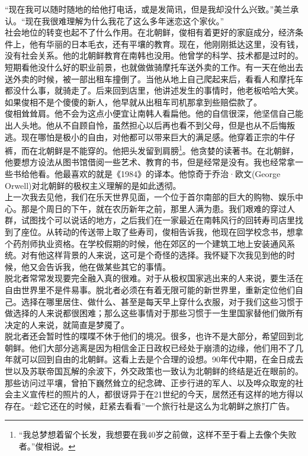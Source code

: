 “现在我可以随时随地的给他打电话，或是发简讯，但是我却没什么兴致。”美兰承认。“现在我很难理解为什么我花了这么多年迷恋这个家伙。”\\

社会地位的转变也起不了什么作用。在北朝鲜，俊相有着更好的家庭成分，经济条件上，他有华丽的日本毛衣，还有平壤的教育。现在，他刚刚抵达这里，没有钱，没有社会关系。他的北朝鲜教育在南韩也没用。他曾学的科学、技术都是过时的。短期看他没什么好的职业前景，也就做做骑摩托车送外卖的工作。有一天在他出去送外卖的时候，被一部出租车撞倒了。当他从地上自己爬起来后，看看人和摩托车都没什么事，就骑走了。后来回到店里，他讲述发生的事情时，他老板哈哈大笑。如果俊相不是个傻傻的新人，他早就从出租车司机那拿到些赔偿款了。\\

俊相耸耸肩。他不会为这点小便宜让南韩人看扁他。他的自信很深，他坚信自己能出人头地。他从不自顾自怜，虽然担心以后再也看不到父母，但是也从不后悔叛逃。现在哪怕是极小的自由，对他都可以带来巨大的满足感。他穿着正宗的牛仔裤，而在北朝鲜是不能穿的。他把头发留到肩膀\footnote{“我总梦想着留个长发，我想要在我40岁之前做，这样不至于看上去像个失败者。”俊相说。}。他贪婪的读著书。在北朝鲜，他要想方设法从图书馆借阅一些艺术、教育的书，但是经常是没有。我也经常拿一些书给他看。他最喜欢的就是《1984》的译本。他惊奇于乔治·欧文(George Orwell)对北朝鲜的极权主义理解的是如此透彻。\\

上一次我去见他，我们在乐天世界见面，一个位于首尔南部的巨大的购物、娱乐中心。那是个周日的下午，就在农历新年之前，那里人满为患。我们艰难的穿过人群，试图找个可以说话的地方，之后我们在一家最近在南韩风行的回转寿司店里找到了座位。从转动的传送带上取了些寿司，俊相告诉我，他现在回学校念书，想拿个药剂师执业资格。在学校假期的时候，他在郊区的一个建筑工地上安装通风系统。对有他这样背景的人来说，这可是个奇怪的选择。我怀疑下次我见到他的时候，他又会告诉我，他在做某些其它的事情。\\

脱北者常常发现要完全融入真的很难。对于从极权国家逃出来的人来说，要生活在自由世界里不是件易事。脱北者必须在有着无限可能的新世界里，重新定位他们自己。选择在哪里居住、做什么、甚至是每天早上穿什么衣服，对于我们这些习惯于做选择的人来说都很困难；那么这些事情对于那些习惯于一生里国家替他们做所有决定的人来说，就简直是梦魇了。\\

脱北者还会暂时性的喋喋不休于他们的境况。很多，也许不是大部分，希望回到北朝鲜。他们大部分逃离是因为相信金正日政权已经处于崩溃的边缘，他们用不了几年就可以回到自由的北朝鲜。这看上去是个合理的设想。90年代中期，在金日成去世以及苏联帝国瓦解的余波下，外交政策也一致认为北朝鲜的终结是近在眼前的。那些访问过平壤，曾拍下巍然耸立的纪念碑、正步行进的军人、以及哗众取宠的社会主义宣传栏的照片的人，都很讶异于在21世纪的今天，居然还有这样的地方得以存在。“趁它还在的时候，赶紧去看看”一个旅行社是这么为北朝鲜之旅打广告。\\

